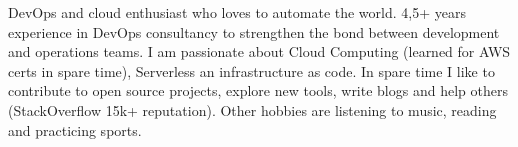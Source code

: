 

\begin{cvparagraph}

DevOps and cloud enthusiast who loves to automate the world. 4,5+ years experience in DevOps consultancy to strengthen the bond between development and operations teams.
I am passionate about Cloud Computing (learned for AWS certs in spare time), Serverless an infrastructure as code. 
In spare time I like to contribute to open source projects, explore new tools, write blogs and help others (StackOverflow 15k+ reputation).
Other hobbies are listening to music, reading and practicing sports.

\end{cvparagraph}
